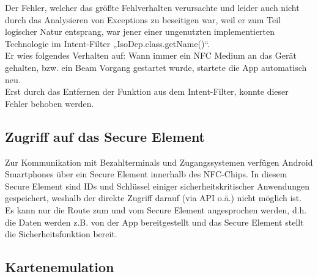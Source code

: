 \documentclass[a4paper,ngerman,12pt]{scrreprt}
\newcommand{\+}{\discretionary{\mbox{\scriptsize$\hookleftarrow$}}{}{}}
\begin{document}
Der Fehler, welcher das größte Fehlverhalten verursachte und leider auch nicht durch das Analysieren von Exceptions zu beseitigen war, weil er zum Teil logischer Natur entsprang, war jener einer ungenutzten implementierten Technologie im Intent-\/\+Filter „\+Iso\+Dep.\+class.\+get\+Name()“. \\
Er wies folgendes Verhalten auf\+: Wann immer ein N\+FC Medium an das Gerät gehalten, bzw. ein Beam Vorgang gestartet wurde, startete die App automatisch neu. \\
Erst durch das Entfernen der Funktion aus dem Intent-\/\+Filter, konnte dieser Fehler behoben werden.

\subsection*{Zugriff auf das Secure Element}

Zur Kommunikation mit Bezahlterminals und Zugangssystemen verfügen Android Smartphones über ein Secure Element innerhalb des N\+F\+C-\/\+Chips. In diesem Secure Element sind I\+Ds und Schlüssel einiger sicherheitskritischer Anwendungen gespeichert, weshalb der direkte Zugriff darauf (via A\+PI o.\+ä.) nicht möglich ist. \\
Es kann nur die Route zum und vom Secure Element angesprochen werden, d.\+h. die Daten werden z.\+B. von der App bereitgestellt und das Secure Element stellt die Sicherheitsfunktion bereit.

\subsection*{Kartenemulation}
\end{document}
